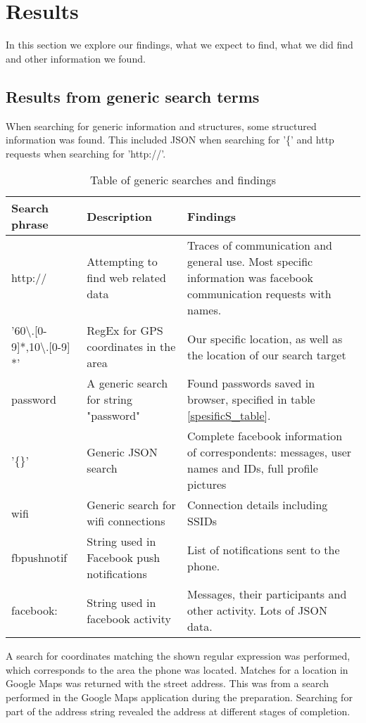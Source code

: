 \section{Results}
In this section we explore our findings, what we expect to find, what we did find and other information we found. 

\subsection{Results from generic search terms}
When searching for generic information and structures, some structured information was found. This included JSON when searching for '\{' and http requests when searching for 'http://'.

\begin{table}[H]
\centering
\label{genericS_table}
\begin{tabular}{|m{2.5cm}|m{2cm}|m{2.5cm}|}
\hline
Search phrase & Description & Findings \\
\hline
http:// & Attempting to find web related data  & Traces of communication and general use. Most specific information was facebook communication requests with names. \\
\hline
'60\textbackslash.[0-9]*,10\textbackslash.[0-9] *' &  RegEx for GPS coordinates in the area & Our specific location, as well as the location of our search target \\
\hline
password & A generic search for string "password" & Found passwords saved in browser, specified in table \ref{spesificS_table}. \\
\hline
'\{\}' & Generic JSON search & Complete facebook information of correspondents: messages, user names and IDs, full profile pictures\\
\hline  
wifi & Generic search for wifi connections & Connection details including SSIDs \\  
\hline
fbpushnotif & String used in Facebook push notifications & List of notifications sent to the phone.\\
\hline
facebook: & String used in facebook activity & Messages, their participants and other activity. Lots of JSON data.\\
\hline
\end{tabular}
\caption{Table of generic searches and findings}
\end{table}

A search for coordinates matching the shown regular expression was performed, which corresponds to the area the phone was located. Matches for a location in Google Maps was returned with the street address. This was from a search performed in the Google Maps application during the preparation. Searching for part of the address string revealed the address at different stages of completion.


